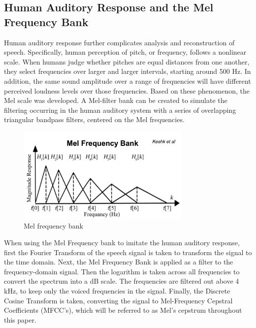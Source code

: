 \subsection{Human Auditory Response and the Mel Frequency Bank}
Human auditory response further complicates analysis and reconstruction of speech. Specifically, human perception of pitch, or frequency, follows a nonlinear scale. When humans judge whether pitches are equal distances from one another, they select frequencies over larger and larger intervals, starting around 500 Hz. In addition, the same sound amplitude over a range of frequencies will have different perceived loudness levels over those frequencies. Based on these phenomenon, the Mel scale was developed\cite{ghosh2012comparative}. A Mel-filter bank can be created to simulate the filtering occurring in the human auditory system with a series of overlapping triangular bandpass filters, centered on the Mel frequencies. 
\begin{figure}[htb]

\begin{minipage}[b]{1.0\linewidth}
  \centering
  \centerline{\includegraphics[width=8.5cm]{image6}}
\end{minipage}
\caption{Mel frequency bank}
\label{fig:melfrequency}
%
\end{figure}

When using the Mel Frequency bank to imitate the human auditory response, first the Fourier Transform of the speech signal is taken to transform the signal to the time domain. Next, the Mel Frequency Bank is applied as a filter to the frequency-domain signal. Then the logarithm is taken across all frequencies to convert the spectrum into a dB scale. The frequencies are filtered out above 4 kHz, to keep only the voiced frequencies in the signal. Finally, the Discrete Cosine Transform is taken, converting the signal to Mel-Frequency Cepstral Coefficients (MFCC's), which will be referred to as Mel's cepstrum throughout this paper.

